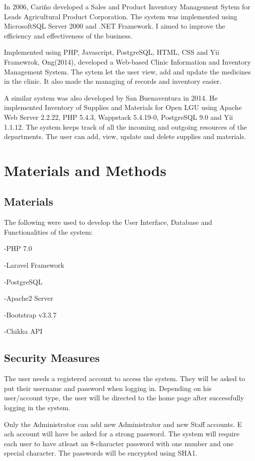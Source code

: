 \documentclass[journal]{./IEEE/IEEEtran}
\begin{document}
In 2006, Cariño developed a Sales and Product Inventory Management Sytem for Leads Agricultural Product Corporation. The system was implemented using MicrosoftSQL Server 2000 and .NET Framework. I aimed to improve the efficiency and effectiveness of the business. \cite{carino11}

Implemented using PHP, Javascript, PostgreSQL, HTML, CSS and Yii Framewrok, Ong(2014), developed a Web-based Clinic Information and Inventory Management System. The sytem let the user view, add and update the medicines in the clinic. It also made the managing of records and inventory easier. \cite{ong14}
	
A similar system was also developed by San Buenaventura in 2014. He implemented Inventory of Supplies and Materials for Open LGU using Apache Web Server 2.2.22, PHP 5.4.3, Wappstack 5.4.19-0, PostgreSQL 9.0 and Yii 1.1.12. The system keeps track of all the incoming and outgoing resources of the departments. The user can add, view, update and delete supplies and materials. \cite{sanbuenaventura14}

\section{Materials and Methods}

\subsection{Materials}
The following were used to develop the User Interface, Database and Functionalities of the system:

-PHP 7.0

-Laravel Framework

-PostgreSQL

-Apache2 Server
 
-Bootstrap v3.3.7

-Chikka API

\subsection{Security Measures}
The user needs a registered account to access the system. They will be asked to put their username and password when logging in. Depending on his user/account type, the user will be directed to the home page after successfully logging in the system. 

Only the Administrator can add new Administrator and new Staff accounts. E
ach account will have be asked for a strong password. The system will require each user to have atleast an 8-character password with one number and one special character. The passwords will be encrypted using SHA1.
\end{document}
